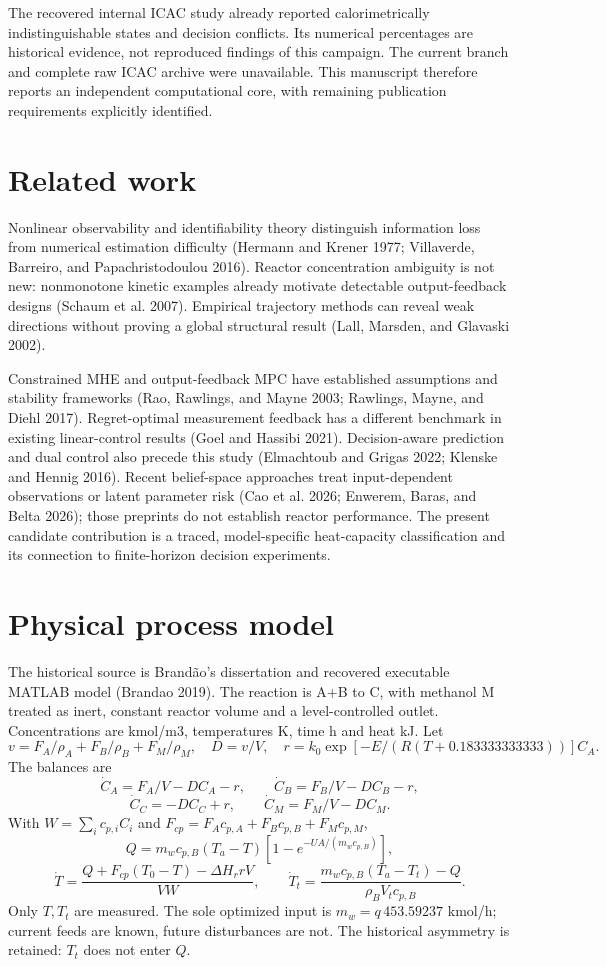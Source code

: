 \documentclass[
  11pt,
]{article}
\begin{document}
The recovered internal ICAC study already reported calorimetrically
indistinguishable states and decision conflicts. Its numerical
percentages are historical evidence, not reproduced findings of this
campaign. The current branch and complete raw ICAC archive were
unavailable. This manuscript therefore reports an independent
computational core, with remaining publication requirements explicitly
identified.

\hypertarget{related-work}{%
\section{Related work}\label{related-work}}

Nonlinear observability and identifiability theory distinguish
information loss from numerical estimation difficulty (Hermann and
Krener 1977; Villaverde, Barreiro, and Papachristodoulou 2016). Reactor
concentration ambiguity is not new: nonmonotone kinetic examples already
motivate detectable output-feedback designs (Schaum et al. 2007).
Empirical trajectory methods can reveal weak directions without proving
a global structural result (Lall, Marsden, and Glavaski 2002).

Constrained MHE and output-feedback MPC have established assumptions and
stability frameworks (Rao, Rawlings, and Mayne 2003; Rawlings, Mayne,
and Diehl 2017). Regret-optimal measurement feedback has a different
benchmark in existing linear-control results (Goel and Hassibi 2021).
Decision-aware prediction and dual control also precede this study
(Elmachtoub and Grigas 2022; Klenske and Hennig 2016). Recent
belief-space approaches treat input-dependent observations or latent
parameter risk (Cao et al. 2026; Enwerem, Baras, and Belta 2026); those
preprints do not establish reactor performance. The present candidate
contribution is a traced, model-specific heat-capacity classification
and its connection to finite-horizon decision experiments.

\hypertarget{physical-process-model}{%
\section{Physical process model}\label{physical-process-model}}

The historical source is Brandão's dissertation and recovered executable
MATLAB model (Brandao 2019). The reaction is A+B to C, with methanol M
treated as inert, constant reactor volume and a level-controlled outlet.
Concentrations are kmol/m3, temperatures K, time h and heat kJ. Let
\[v=F_A/\rho_A+F_B/\rho_B+F_M/\rho_M,\quad D=v/V,\quad
r=k_0\exp[-E/(R(T+0.183333333333))]C_A.\] The balances are
\[\dot C_A=F_A/V-DC_A-r,\qquad \dot C_B=F_B/V-DC_B-r,\]
\[\dot C_C=-DC_C+r,\qquad\dot C_M=F_M/V-DC_M.\] With
\(W=\sum_i c_{p,i}C_i\) and \(F_{cp}=F_Ac_{p,A}+F_Bc_{p,B}+F_Mc_{p,M}\),
\[Q=m_wc_{p,B}(T_a-T)[1-e^{-UA/(m_wc_{p,B})}],\]
\[\dot T=\frac{Q+F_{cp}(T_0-T)-\Delta H_r rV}{VW},\qquad
\dot T_t=\frac{m_wc_{p,B}(T_a-T_t)-Q}{\rho_BV_tc_{p,B}}.\] Only
\(T,T_t\) are measured. The sole optimized input is \(m_w=q\,453.59237\)
kmol/h; current feeds are known, future disturbances are not. The
historical asymmetry is retained: \(T_t\) does not enter \(Q\).
\end{document}
